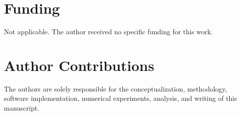 \documentclass[11pt,a4paper]{article}
\theoremstyle{definition}
\theoremstyle{remark}
\numberwithin{equation}{section}
\numberwithin{figure}{section}
\numberwithin{table}{section}
\begin{document}
\section*{Funding}
Not applicable. The author received no specific funding for this work.

\section*{Author Contributions}
The authors are solely responsible for the conceptualization, methodology, software implementation, numerical experiments, analysis, and writing of this manuscript.






\appendix

\renewcommand{\thesubsection}{\Alph{section}.\arabic{subsection}}
\end{document}
